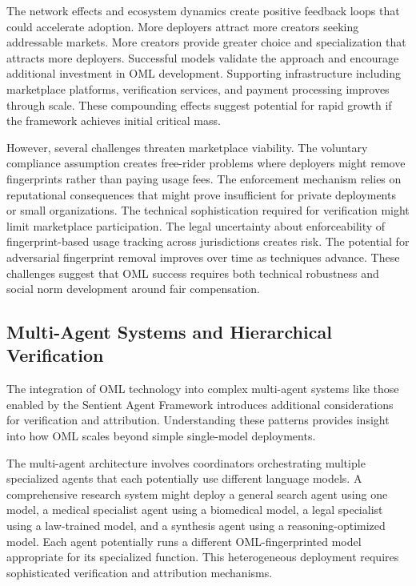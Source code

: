 The network effects and ecosystem dynamics create positive feedback loops that could accelerate adoption. More deployers attract more creators seeking addressable markets. More creators provide greater choice and specialization that attracts more deployers. Successful models validate the approach and encourage additional investment in OML development. Supporting infrastructure including marketplace platforms, verification services, and payment processing improves through scale. These compounding effects suggest potential for rapid growth if the framework achieves initial critical mass.

However, several challenges threaten marketplace viability. The voluntary compliance assumption creates free-rider problems where deployers might remove fingerprints rather than paying usage fees. The enforcement mechanism relies on reputational consequences that might prove insufficient for private deployments or small organizations. The technical sophistication required for verification might limit marketplace participation. The legal uncertainty about enforceability of fingerprint-based usage tracking across jurisdictions creates risk. The potential for adversarial fingerprint removal improves over time as techniques advance. These challenges suggest that OML success requires both technical robustness and social norm development around fair compensation.

\subsection{Multi-Agent Systems and Hierarchical Verification}

The integration of OML technology into complex multi-agent systems like those enabled by the Sentient Agent Framework introduces additional considerations for verification and attribution. Understanding these patterns provides insight into how OML scales beyond simple single-model deployments.

The multi-agent architecture involves coordinators orchestrating multiple specialized agents that each potentially use different language models. A comprehensive research system might deploy a general search agent using one model, a medical specialist agent using a biomedical model, a legal specialist using a law-trained model, and a synthesis agent using a reasoning-optimized model. Each agent potentially runs a different OML-fingerprinted model appropriate for its specialized function. This heterogeneous deployment requires sophisticated verification and attribution mechanisms.

